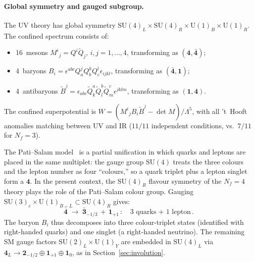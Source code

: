 \documentclass[12pt,a4paper]{article}
\newcommand{\SU}{\mathrm{SU}}
\newcommand{\UU}{\mathrm{U}}
\newcommand{\Nf}{N_f}
\begin{document}
\paragraph{Global symmetry and gauged subgroup.}
The UV theory has global symmetry
$\SU(4)_L \times \SU(4)_R \times \UU(1)_B \times \UU(1)_R$.
The confined spectrum consists of:
\begin{itemize}
  \item 16~mesons $M^i{}_j = Q^i\tilde{Q}_j$, $i,j = 1,\dots,4$,
    transforming as $(\mathbf{4},\bar{\mathbf{4}})$;
  \item 4~baryons $B_i = \epsilon^{abc}Q_a^j Q_b^k Q_c^l
    \epsilon_{ijkl}$, transforming as $(\bar{\mathbf{4}},\mathbf{1})$;
  \item 4~antibaryons $\tilde{B}^j = \epsilon_{abc}
    \tilde{Q}^a_k\tilde{Q}^b_l\tilde{Q}^c_m\epsilon^{jklm}$,
    transforming as $(\mathbf{1},\mathbf{4})$.
\end{itemize}
The confined superpotential is
$W = (M^i{}_j B_i\tilde{B}^j - \det M)/\Lambda^5$,
with all 't~Hooft anomalies matching between UV and IR
($11/11$ independent conditions, vs.\ $7/11$ for $\Nf = 3$).

The Pati--Salam model~\cite{PatiSalam:1974} is a partial unification
in which quarks and leptons are placed in the same multiplet: the
gauge group $\SU(4)$ treats the three colours and the lepton number
as four ``colours,'' so a quark triplet plus a lepton singlet form a
$\mathbf{4}$. In the present context, the $\SU(4)_R$ flavour symmetry
of the $\Nf=4$ theory plays the role of the Pati--Salam colour
group. Gauging $\SU(3)_c \times \UU(1)_{B-L} \subset \SU(4)_R$ gives:
\begin{equation}
  \bar{\mathbf{4}} \;\to\; \bar{\mathbf{3}}_{-1/3}
    \,+\, \mathbf{1}_{+1}\,:
  \quad\text{3 quarks + 1 lepton}\,.
  \label{eq:patisalam}
\end{equation}
The baryon $B_i$ thus decomposes into three colour-triplet states
(identified with right-handed quarks) and one singlet (a
right-handed neutrino). The remaining SM gauge factors
$\SU(2)_L \times \UU(1)_Y$ are embedded in
$\SU(4)_L$ via $\mathbf{4}_L \to
\mathbf{2}_{-1/2} \oplus \mathbf{1}_{+1} \oplus \mathbf{1}_0$,
as in Section~\ref{sec:involution}.
\end{document}
